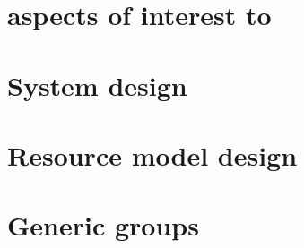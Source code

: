 

\section{\texorpdfstring{}{INP} aspects of interest to \texorpdfstring{}{RMs}}


\section{System design}


\section{Resource model design} \label{model_design}


\section{Generic groups}
